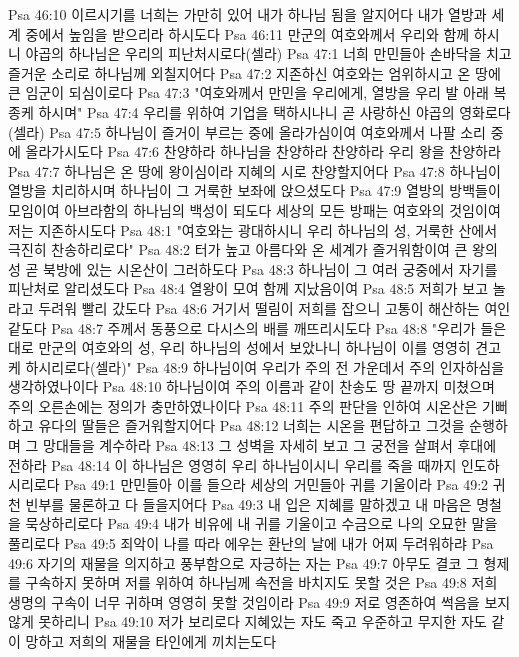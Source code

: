 Psa 46:10  이르시기를 너희는 가만히 있어 내가 하나님 됨을 알지어다 내가 열방과 세계 중에서 높임을 받으리라 하시도다
Psa 46:11  만군의 여호와께서 우리와 함께 하시니 야곱의 하나님은 우리의 피난처시로다(셀라)
Psa 47:1  너희 만민들아 손바닥을 치고 즐거운 소리로 하나님께 외칠지어다
Psa 47:2  지존하신 여호와는 엄위하시고 온 땅에 큰 임군이 되심이로다
Psa 47:3  "여호와께서 만민을 우리에게, 열방을 우리 발 아래 복종케 하시며"
Psa 47:4  우리를 위하여 기업을 택하시나니 곧 사랑하신 야곱의 영화로다 (셀라)
Psa 47:5  하나님이 즐거이 부르는 중에 올라가심이여 여호와께서 나팔 소리 중에 올라가시도다
Psa 47:6  찬양하라 하나님을 찬양하라 찬양하라 우리 왕을 찬양하라
Psa 47:7  하나님은 온 땅에 왕이심이라 지혜의 시로 찬양할지어다
Psa 47:8  하나님이 열방을 치리하시며 하나님이 그 거룩한 보좌에 앉으셨도다
Psa 47:9  열방의 방백들이 모임이여 아브라함의 하나님의 백성이 되도다 세상의 모든 방패는 여호와의 것임이여 저는 지존하시도다
Psa 48:1  "여호와는 광대하시니 우리 하나님의 성, 거룩한 산에서 극진히 찬송하리로다"
Psa 48:2  터가 높고 아름다와 온 세계가 즐거워함이여 큰 왕의 성 곧 북방에 있는 시온산이 그러하도다
Psa 48:3  하나님이 그 여러 궁중에서 자기를 피난처로 알리셨도다
Psa 48:4  열왕이 모여 함께 지났음이여
Psa 48:5  저희가 보고 놀라고 두려워 빨리 갔도다
Psa 48:6  거기서 떨림이 저희를 잡으니 고통이 해산하는 여인 같도다
Psa 48:7  주께서 동풍으로 다시스의 배를 깨뜨리시도다
Psa 48:8  "우리가 들은 대로 만군의 여호와의 성, 우리 하나님의 성에서 보았나니 하나님이 이를 영영히 견고케 하시리로다(셀라)"
Psa 48:9  하나님이여 우리가 주의 전 가운데서 주의 인자하심을 생각하였나이다
Psa 48:10  하나님이여 주의 이름과 같이 찬송도 땅 끝까지 미쳤으며 주의 오른손에는 정의가 충만하였나이다
Psa 48:11  주의 판단을 인하여 시온산은 기뻐하고 유다의 딸들은 즐거워할지어다
Psa 48:12  너희는 시온을 편답하고 그것을 순행하며 그 망대들을 계수하라
Psa 48:13  그 성벽을 자세히 보고 그 궁전을 살펴서 후대에 전하라
Psa 48:14  이 하나님은 영영히 우리 하나님이시니 우리를 죽을 때까지 인도하시리로다
Psa 49:1  만민들아 이를 들으라 세상의 거민들아 귀를 기울이라
Psa 49:2  귀천 빈부를 물론하고 다 들을지어다
Psa 49:3  내 입은 지혜를 말하겠고 내 마음은 명철을 묵상하리로다
Psa 49:4  내가 비유에 내 귀를 기울이고 수금으로 나의 오묘한 말을 풀리로다
Psa 49:5  죄악이 나를 따라 에우는 환난의 날에 내가 어찌 두려워하랴
Psa 49:6  자기의 재물을 의지하고 풍부함으로 자긍하는 자는
Psa 49:7  아무도 결코 그 형제를 구속하지 못하며 저를 위하여 하나님께 속전을 바치지도 못할 것은
Psa 49:8  저희 생명의 구속이 너무 귀하며 영영히 못할 것임이라
Psa 49:9  저로 영존하여 썩음을 보지 않게 못하리니
Psa 49:10  저가 보리로다 지혜있는 자도 죽고 우준하고 무지한 자도 같이 망하고 저희의 재물을 타인에게 끼치는도다
